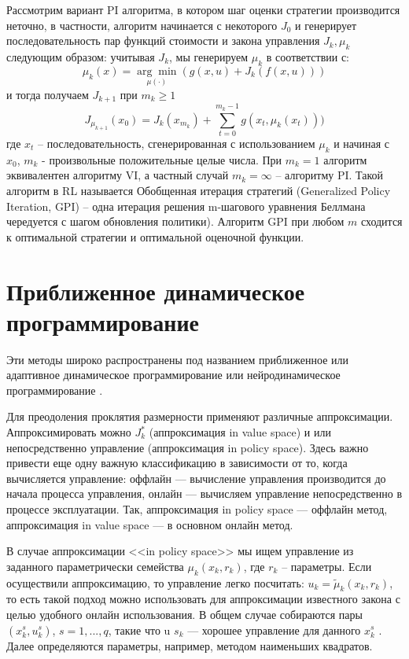 Рассмотрим вариант PI алгоритма, в котором шаг оценки стратегии производится неточно, в частности, алгоритм начинается с некоторого $J_0$ и генерирует последовательность пар функций стоимости и закона управления ${J_k, \mu_k}$ следующим образом: учитывая $J_k$, мы генерируем $\mu_k$ в соответствии с:
\begin{equation*}
	\mu_{k}(x) =  \underset{\mu(\cdot)}{\arg\min}(g(x, u) + J_{k}(f(x,u)))
\end{equation*}
и тогда получаем $J_{k+1}$ при $m_k \geq 1$
\begin{equation*}
		J_{\mu_{k+1}}(x_0)=J_k(x_{m_k}) + \sum^{m_k-1}_{t=0}g(x_t,\mu_k(x_t)))
\end{equation*}
где ${x_t}$ -- последовательность, сгенерированная с использованием $\mu_k$ и начиная с $x_0$, $m_k$ - произвольные положительные целые числа. При $m_k = 1$ алгоритм эквивалентен  алгоритму VI, а частный случай $m_k = \infty$ -- алгоритму PI. Такой алгоритм в RL называется Обобщенная итерация стратегий (Generalized Policy Iteration, GPI) -- одна итерация решения m-шагового уравнения Беллмана чередуется с шагом обновления политики). Алгоритм GPI при любом $m$ сходится к оптимальной стратегии и оптимальной оценочной функции.

\section{Приближенное динамическое программирование}
Эти методы широко распространены под названием приближенное или адаптивное динамическое программирование \cite{werbos1992approximate} или нейродинамическое программирование \cite{bertsekas1996neuro}.

Для преодоления  проклятия размерности применяют различные аппроксимации. Аппроксимировать можно $J_k^*$ (аппроксимация in value space) и или непосредственно управление (аппроксимация in policy space). Здесь важно привести еще одну важную классификацию в зависимости от то, когда вычисляется управление: оффлайн — вычисление управления производится до начала процесса управления, онлайн — вычисляем управление непосредственно в процессе эксплуатации. Так, аппроксимация in policy space — оффлайн метод, аппроксимация in value space — в основном онлайн метод.

В случае аппроксимации <<in policy space>> мы ищем управление из заданного параметрически семейства $\mu_k(x_k, r_k)$, где $r_k$ – параметры. Если осуществили аппроксимацию, то управление легко посчитать: $u_k = \widetilde{\mu}_k (x_k , r_k )$, то есть такой подход можно использовать для аппроксимации известного закона с целью удобного онлайн использования. В общем случае собираются пары $(x^s_k , u^s_k )$, $s = 1,..., q$, такие что u $s_k$ — хорошее управление для данного $x^s_k$ . Далее определяются параметры, например, методом наименьших квадратов.


